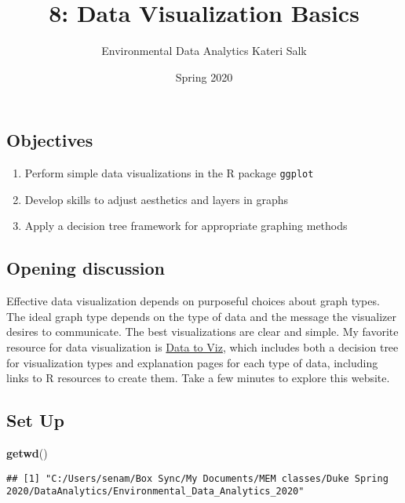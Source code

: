 \documentclass[
]{article}
\title{8: Data Visualization Basics}
\author{Environmental Data Analytics \textbar{} Kateri Salk}
\date{Spring 2020}
\newenvironment{Shaded}{\begin{snugshade}}{\end{snugshade}}
\newcommand{\KeywordTok}[1]{\textcolor[rgb]{0.13,0.29,0.53}{\textbf{#1}}}
\newcommand{\NormalTok}[1]{#1}
\providecommand{\tightlist}{%
  \setlength{\itemsep}{0pt}\setlength{\parskip}{0pt}}
\begin{document}
\maketitle

\hypertarget{objectives}{%
\subsection{Objectives}\label{objectives}}

\begin{enumerate}
\def\labelenumi{\arabic{enumi}.}
\tightlist
\item
  Perform simple data visualizations in the R package \texttt{ggplot}
\item
  Develop skills to adjust aesthetics and layers in graphs
\item
  Apply a decision tree framework for appropriate graphing methods
\end{enumerate}

\hypertarget{opening-discussion}{%
\subsection{Opening discussion}\label{opening-discussion}}

Effective data visualization depends on purposeful choices about graph
types. The ideal graph type depends on the type of data and the message
the visualizer desires to communicate. The best visualizations are clear
and simple. My favorite resource for data visualization is
\href{https://www.data-to-viz.com/}{Data to Viz}, which includes both a
decision tree for visualization types and explanation pages for each
type of data, including links to R resources to create them. Take a few
minutes to explore this website.

\hypertarget{set-up}{%
\subsection{Set Up}\label{set-up}}

\begin{Shaded}
\begin{Highlighting}[]
\KeywordTok{getwd}\NormalTok{()}
\end{Highlighting}
\end{Shaded}

\begin{verbatim}
## [1] "C:/Users/senam/Box Sync/My Documents/MEM classes/Duke Spring 2020/DataAnalytics/Environmental_Data_Analytics_2020"
\end{verbatim}
\end{document}
